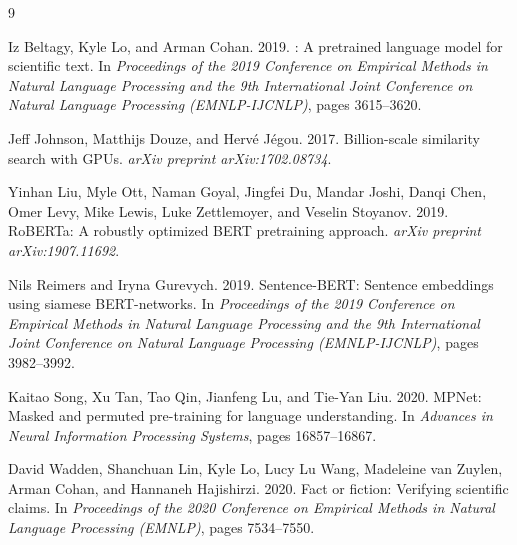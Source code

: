\documentclass[11pt]{article}
\begin{document}
\begin{thebibliography}{9}

Iz Beltagy, Kyle Lo, and Arman Cohan. 2019.
: A pretrained language model for scientific text.
\newblock In \textit{Proceedings of the 2019 Conference on Empirical Methods in Natural Language Processing and the 9th International Joint Conference on Natural Language Processing (EMNLP-IJCNLP)}, pages 3615--3620.

Jeff Johnson, Matthijs Douze, and Herv\'{e} J\'{e}gou. 2017.
\newblock Billion-scale similarity search with GPUs.
\newblock \textit{arXiv preprint arXiv:1702.08734}.

Yinhan Liu, Myle Ott, Naman Goyal, Jingfei Du, Mandar Joshi, Danqi Chen, Omer Levy, Mike Lewis, Luke Zettlemoyer, and Veselin Stoyanov. 2019.
\newblock RoBERTa: A robustly optimized {BERT} pretraining approach.
\newblock \textit{arXiv preprint arXiv:1907.11692}.

Nils Reimers and Iryna Gurevych. 2019.
\newblock Sentence-BERT: Sentence embeddings using siamese {BERT}-networks.
\newblock In \textit{Proceedings of the 2019 Conference on Empirical Methods in Natural Language Processing and the 9th International Joint Conference on Natural Language Processing (EMNLP-IJCNLP)}, pages 3982--3992.

Kaitao Song, Xu Tan, Tao Qin, Jianfeng Lu, and Tie-Yan Liu. 2020.
\newblock MPNet: Masked and permuted pre-training for language understanding.
\newblock In \textit{Advances in Neural Information Processing Systems}, pages 16857--16867.

David Wadden, Shanchuan Lin, Kyle Lo, Lucy Lu Wang, Madeleine van Zuylen, Arman Cohan, and Hannaneh Hajishirzi. 2020.
\newblock Fact or fiction: Verifying scientific claims.
\newblock In \textit{Proceedings of the 2020 Conference on Empirical Methods in Natural Language Processing (EMNLP)}, pages 7534--7550.

\end{thebibliography}
\end{document}
